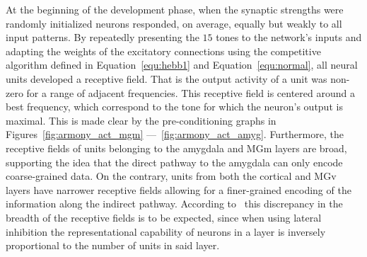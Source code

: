 At the beginning of the development phase, when the synaptic strengths were randomly initialized neurons responded, on average, equally but weakly to all input patterns. By repeatedly presenting the $15$ tones to the network's inputs and adapting the weights of the excitatory connections using the competitive algorithm defined in Equation~\ref{equ:hebb1} and Equation~\ref{equ:normal}, all neural units developed a receptive field. That is the output activity of a unit was non-zero for a range of adjacent frequencies. This receptive field is centered around a best frequency, which correspond to the tone for which the neuron's output is maximal. This is made clear by the pre-conditioning graphs in Figures~\ref{fig:armony_act_mgm} ---~\ref{fig:armony_act_amyg}. Furthermore, the receptive fields of units belonging to the amygdala and MGm layers are broad, supporting the idea that the direct pathway to the amygdala can only encode coarse-grained data. On the contrary, units from both the cortical and MGv layers have narrower receptive fields allowing for a finer-grained encoding of the information along the indirect pathway. According to~\citet{Armony1995} this discrepancy in the breadth of the receptive fields is to be expected, since when using lateral inhibition the representational capability of neurons in a layer is inversely proportional to the number of units in said layer.\\

